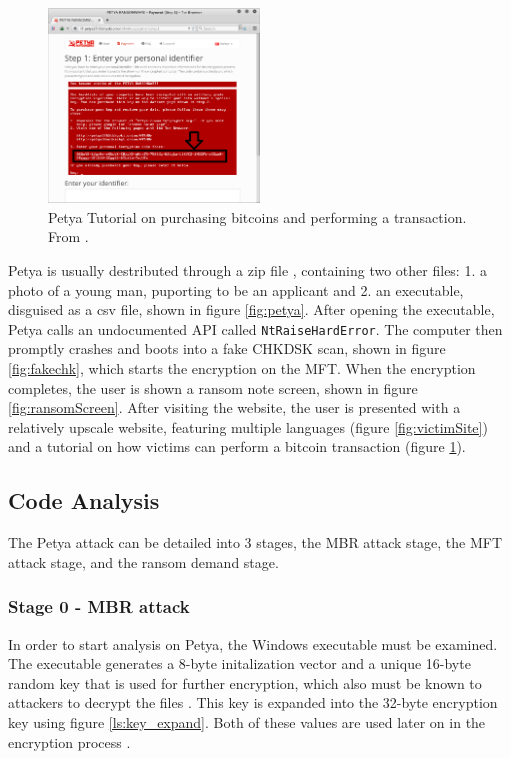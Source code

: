 \documentclass[twocolumn]{article}
\newcommand{\code}[1]{\texttt{#1}}
\begin{document}
\begin{figure}
	\includegraphics[width = 0.5\textwidth]{victimTutorial.png}
	\caption{Petya Tutorial on purchasing bitcoins and performing a transaction. From \cite{lowLevelPetya}.}
	\label{fig:victimTutorial}
\end{figure}
Petya is usually destributed through a zip file \cite{lowLevelPetya}, containing two other files: 1. a photo of a young man, puporting to be an applicant and 2. an executable, disguised as a csv file, shown in figure \ref{fig:petya}. 
After opening the executable, Petya calls an undocumented API called \code{NtRaiseHardError}. The computer then promptly crashes and boots into a fake CHKDSK scan, shown in figure \ref{fig:fakechk}, which starts the encryption on the MFT. When the encryption completes, the user is shown a ransom note screen, shown in figure \ref{fig:ransomScreen}. After visiting the website, the user is presented with a relatively upscale website, featuring multiple languages (figure \ref{fig:victimSite}) and a tutorial on how victims can perform a bitcoin transaction (figure \ref{fig:victimTutorial}). 
\subsection{Code Analysis}
The Petya attack can be detailed into 3 stages, the MBR attack stage, the MFT attack stage, and the ransom demand stage.
\subsubsection{Stage 0 - MBR attack}
In order to start analysis on Petya, the Windows executable must be examined. The executable generates a 8-byte initalization vector and a unique 16-byte random key that is used for further encryption, which also must be known to attackers to decrypt the files \cite{lowLevelPetya}. This key is expanded into the 32-byte encryption key using figure \ref{ls:key_expand}. Both of these values are used later on in the encryption process \cite{decryptPetya}. 
\end{document}
